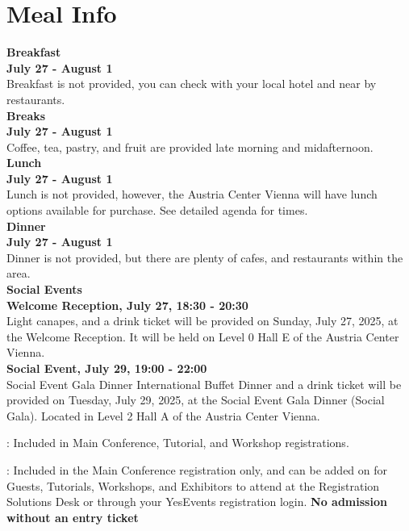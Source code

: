 \chapter{Meal Info}
\vspace*{0.2cm}

\textbf{Breakfast}\\

\textbf{July 27 - August 1}\\
Breakfast is not provided, you can check with your local hotel and near by restaurants.\\

\textbf{Breaks \ast}\\

\textbf{July 27 - August 1}\\
Coffee, tea, pastry, and fruit are provided late morning and midafternoon.\\

\textbf{Lunch}\\

\textbf{July 27 - August 1}\\
Lunch is not provided, however, the Austria Center Vienna will have lunch options available for purchase. See detailed agenda for times. \\

\textbf{Dinner}\\

\textbf{July 27 - August 1}\\

Dinner is  not provided, but there are plenty of cafes, and restaurants within the area.\\

\textbf{Social Events \ast\ast} \\
\textbf{Welcome Reception, July 27, 18:30 - 20:30}\\

Light canapes, and a drink ticket will be provided on Sunday, July 27, 2025, at the Welcome Reception. It will be held on Level 0 Hall E of the Austria Center Vienna.\\

\textbf{Social Event, July 29, 19:00 - 22:00}\\

Social Event Gala Dinner International Buffet Dinner and a drink ticket will be provided on Tuesday, July 29, 2025, at the Social Event Gala Dinner (Social Gala). Located in Level 2 Hall A of the Austria Center Vienna.\\

\vspace{4em}

\ast: Included in Main Conference, Tutorial, and Workshop registrations.

\ast\ast: Included in the Main Conference registration only, and can be added on for Guests, Tutorials, Workshops, and Exhibitors to attend at the Registration Solutions Desk or through your YesEvents registration login. \textbf{No admission without an entry ticket}

